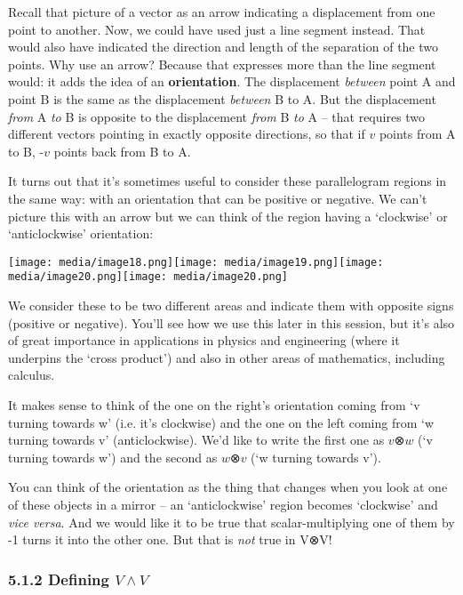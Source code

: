 \documentclass[oneside,english]{amsbook}
\numberwithin{section}{chapter}
\theoremstyle{plain}
\theoremstyle{definition}
\begin{document}
Recall that picture of a vector as an arrow indicating a displacement
from one point to another. Now, we could have used just a line segment
instead. That would also have indicated the direction and length of the
separation of the two points. Why use an arrow? Because that expresses
more than the line segment would: it adds the idea of an
\textbf{orientation}. The displacement \emph{between} point A and point
B is the same as the displacement \emph{between} B to A. But the
displacement \emph{from} A \emph{to} B is opposite to the displacement
\emph{from} B \emph{to} A -- that requires two different vectors
pointing in exactly opposite directions, so that if $v$ points from A
to B, -$v$ points back from B to A.

It turns out that it's sometimes useful to consider these parallelogram
regions in the same way: with an orientation that can be positive or
negative. We can't picture this with an arrow but we can think of the
region having a `clockwise' or `anticlockwise' orientation:

\texttt{[image: media/image18.png]}\texttt{[image: media/image19.png]}\texttt{[image: media/image20.png]}\texttt{[image: media/image20.png]}

We consider these to be two different areas and indicate them with
opposite signs (positive or negative). You'll see how we use this later
in this session, but it's also of great importance in applications in
physics and engineering (where it underpins the `cross product') and
also in other areas of mathematics, including calculus.

It makes sense to think of the one on the right's orientation coming
from `v turning towards w' (i.e. it's clockwise) and the one on the
left coming from `w turning towards v' (anticlockwise). We'd like to
write the first one as $v$⊗$w$ (`v turning towards w') and the
second as $w$⊗$v$ (`w turning towards v').

You can think of the orientation as the thing that changes when you look
at one of these objects in a mirror -- an `anticlockwise' region
becomes `clockwise' and \emph{vice versa}. And we would like it to be
true that scalar-multiplying one of them by -1 turns it into the other
one. But that is \emph{not} true in V⊗V!

\subsubsection{\texorpdfstring{5.1.2 Defining
		\(V \land V\)}{5.1.2 Defining V \textbackslash land V}}\label{defining-v-land-v}
\end{document}

